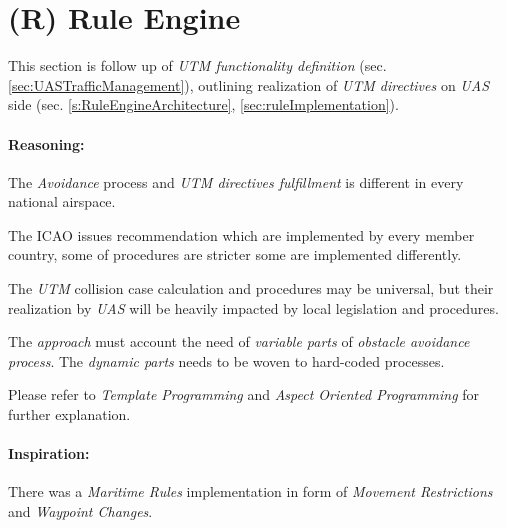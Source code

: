 \section{(R) Rule Engine}\label{sec:ruleEngine}

\noindent This section is follow up of \emph{UTM functionality definition} (sec. \ref{sec:UASTrafficManagement}), outlining realization of \emph{UTM directives} on \emph{UAS} side (sec. \ref{s:RuleEngineArchitecture},  \ref{sec:ruleImplementation}).

\paragraph{Reasoning:} The \emph{Avoidance} process and \emph{UTM directives fulfillment} is different in every national airspace. 

The ICAO issues recommendation \cite{icao4444,icaoAnnex2} which are implemented by every member country, some of procedures are stricter some are implemented differently.

The \emph{UTM} collision case calculation and procedures may be universal, but their realization by \emph{UAS} will be heavily impacted by local legislation and procedures. 

The \emph{approach} must account the need of \emph{variable parts} of \emph{obstacle avoidance process}. The \emph{dynamic parts} needs to be woven to hard-coded processes. 

\begin{note}
 Please refer to \emph{Template Programming} and \emph{Aspect Oriented Programming} for further explanation.
\end{note}

\paragraph{Inspiration:} There was a \emph{Maritime Rules} implementation \cite{benjamin2006navigation} in form of \emph{Movement Restrictions} and \emph{Waypoint Changes}.
